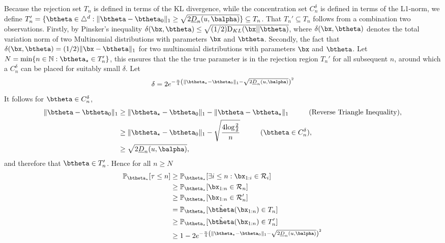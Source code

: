 \documentclass[11pt]{article}
\def\log{{\rm log}}
\newcommand{\KL}{\mathrm{D}_{KL}}
\begin{document}
Because the rejection set $T_n$ is defined in terms of the KL divergence, while the concentration set $C_n^\delta$ is defined in terms of the L1-norm, we define
$T_n' = \{\btheta \in \triangle^d : \|\btheta-\btheta_0\|_1 \geq \sqrt{2\underline{D}_n(u,\balpha)}\} \subseteq T_n$. 
That $T_n' \subseteq T_n$ follows from a combination two observations.
Firstly, by Pinsker's inequality $\delta(\bx, \btheta)\leq \sqrt{(1/2)\KL(\bx||\btheta)}$, where $\delta(\bx, \btheta)$ denotes the total variation norm of two Multinomial distributions with parameters $\bx$ and $\btheta$.
Secondly, the fact that $\delta(\bx,\btheta)=(1/2)\|\bx - \btheta\|_1 $ for two multinomial distributions with parameters $\bx$ and $\btheta$.
Let $N = \min \{n \in \mathbb{N} : \btheta_\star \in T_n'\}$, this ensures that the the true parameter is in the rejection region $T_n'$ for all subsequent $n$, around which a $C_n^\delta$ can be placed for suitably small $\delta$.
Let
\begin{equation*}
  \delta = 2e^{-\frac{n}{4}\left(\|\btheta_\star - \btheta_0\|_1-\sqrt{2\underline{D}_n(u,\balpha)}\right)^2}
\end{equation*}
It follows for $\btheta \in C_n^\delta$, 
\begin{align*}
  \|\btheta-\btheta_0\|_1 &\geq  \|\btheta_\star - \btheta_0\|_1 - \|\btheta - \btheta_\star \|_1 \hspace{1cm}\text{(Reverse Triangle Inequality)},\\
  &\geq  \|\btheta_\star - \btheta_0 \|_1 -  \sqrt{\frac{4\log \frac{2}{\delta}}{n}} \hspace{1cm} (\btheta \in C_n^\delta),\\
  &\geq \sqrt{2\underline{D}_n(u,\balpha)},
\end{align*}
and therefore that $\btheta \in T_n'$. Hence for all $n \geq N$
\begin{align*}
  \mathbb{P}_{\btheta_\star}[\tau \leq n] &\geq \mathbb{P}_{\btheta_\star}[\exists i \leq n : \bx_{1:i} \in \mathcal{R}_i]\\ 
&\geq \mathbb{P}_{\btheta_\star}[\bx_{1:n} \in \mathcal{R}_n]\\ 
&\geq \mathbb{P}_{\btheta_\star}[\bx_{1:n} \in \mathcal{R}'_n]\\ 
&= \mathbb{P}_{\btheta_\star}[\hat{\btheta}(\bx_{1:n}) \in T_n]\\ 
&\geq \mathbb{P}_{\btheta_\star}[\hat{\btheta}(\bx_{1:n}) \in T_n']\\
&\geq 1 -2e^{-\frac{n}{4}\left(\|\btheta_\star - \btheta_0\|_1-\sqrt{2\underline{D}_n(u,\balpha)}\right)^2}
\end{align*}
\end{document}
